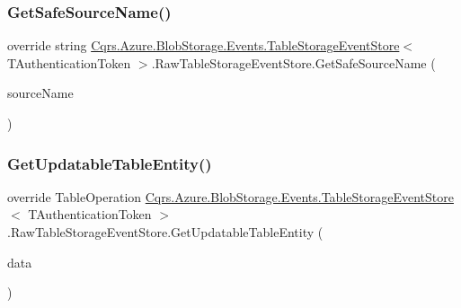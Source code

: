 \subsubsection{\texorpdfstring{Get\+Safe\+Source\+Name()}{GetSafeSourceName()}}
{\footnotesize\ttfamily override string \hyperlink{classCqrs_1_1Azure_1_1BlobStorage_1_1Events_1_1TableStorageEventStore}{Cqrs.\+Azure.\+Blob\+Storage.\+Events.\+Table\+Storage\+Event\+Store}$<$ T\+Authentication\+Token $>$.Raw\+Table\+Storage\+Event\+Store.\+Get\+Safe\+Source\+Name (\begin{DoxyParamCaption}\item[{string}]{source\+Name }\end{DoxyParamCaption})\hspace{0.3cm}{\ttfamily [protected]}}

\mbox{\label{classCqrs_1_1Azure_1_1BlobStorage_1_1Events_1_1TableStorageEventStore_1_1RawTableStorageEventStore_afa1fdd2a115ebf6e12411f8a9e7029a9}} 
\subsubsection{\texorpdfstring{Get\+Updatable\+Table\+Entity()}{GetUpdatableTableEntity()}\hspace{0.1cm}{\footnotesize\ttfamily [1/2]}}
{\footnotesize\ttfamily override Table\+Operation \hyperlink{classCqrs_1_1Azure_1_1BlobStorage_1_1Events_1_1TableStorageEventStore}{Cqrs.\+Azure.\+Blob\+Storage.\+Events.\+Table\+Storage\+Event\+Store}$<$ T\+Authentication\+Token $>$.Raw\+Table\+Storage\+Event\+Store.\+Get\+Updatable\+Table\+Entity (\begin{DoxyParamCaption}\item[{\hyperlink{classCqrs_1_1Events_1_1EventData}{Event\+Data}}]{data }\end{DoxyParamCaption})\hspace{0.3cm}{\ttfamily [protected]}}

